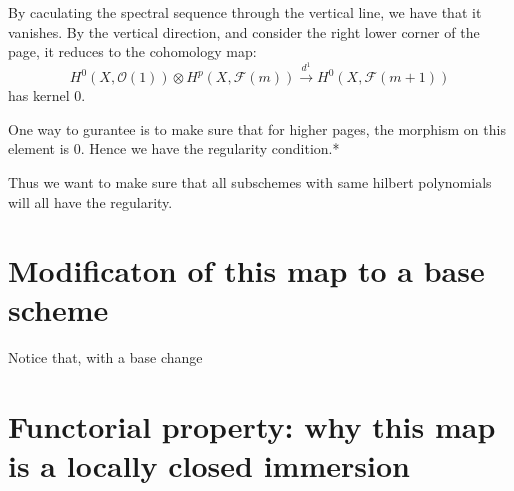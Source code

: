 \documentclass[12pt]{article}
\begin{document}
By caculating the spectral sequence through the vertical line, we have that it vanishes. By the vertical direction, and consider the right lower corner of the page, it reduces to the cohomology map:
\begin{displaymath}
  H^0(X,\mathcal{O}(1))\otimes H^p(X,\mathcal{F}(m)) \xrightarrow{d^1} H^0(X,\mathcal{F}(m+1))
\end{displaymath} 
has kernel 0. 
 

One way to gurantee is to make sure that for higher pages, the morphism on this element is 0. Hence we have the regularity condition.*


Thus we want to make sure that all subschemes with same hilbert polynomials will all have the regularity.

\section{Modificaton of this map to a base scheme}

Notice that, with a base change 
\section{Functorial property: why this map is a  locally closed immersion}
\label{sec:label}
\end{document}
